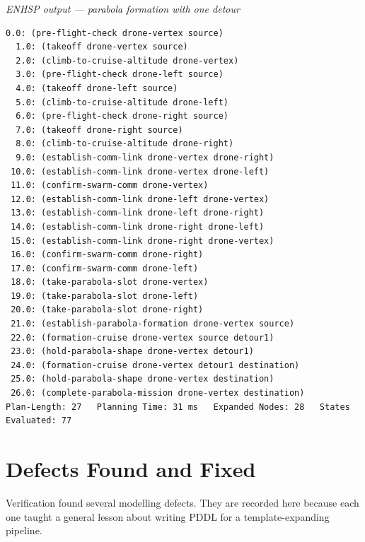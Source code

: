 \documentclass[11pt,a4paper,oneside]{report}
\newcommand{\recordlabel}[1]{\par\smallskip\noindent\hspace*{1.2em}\textit{#1}\par}
\begin{document}
\recordlabel{ENHSP output --- parabola formation with one detour}
\begin{lstlisting}[style=plain]
  0.0: (pre-flight-check drone-vertex source)
  1.0: (takeoff drone-vertex source)
  2.0: (climb-to-cruise-altitude drone-vertex)
  3.0: (pre-flight-check drone-left source)
  4.0: (takeoff drone-left source)
  5.0: (climb-to-cruise-altitude drone-left)
  6.0: (pre-flight-check drone-right source)
  7.0: (takeoff drone-right source)
  8.0: (climb-to-cruise-altitude drone-right)
  9.0: (establish-comm-link drone-vertex drone-right)
 10.0: (establish-comm-link drone-vertex drone-left)
 11.0: (confirm-swarm-comm drone-vertex)
 12.0: (establish-comm-link drone-left drone-vertex)
 13.0: (establish-comm-link drone-left drone-right)
 14.0: (establish-comm-link drone-right drone-left)
 15.0: (establish-comm-link drone-right drone-vertex)
 16.0: (confirm-swarm-comm drone-right)
 17.0: (confirm-swarm-comm drone-left)
 18.0: (take-parabola-slot drone-vertex)
 19.0: (take-parabola-slot drone-left)
 20.0: (take-parabola-slot drone-right)
 21.0: (establish-parabola-formation drone-vertex source)
 22.0: (formation-cruise drone-vertex source detour1)
 23.0: (hold-parabola-shape drone-vertex detour1)
 24.0: (formation-cruise drone-vertex detour1 destination)
 25.0: (hold-parabola-shape drone-vertex destination)
 26.0: (complete-parabola-mission drone-vertex destination)
Plan-Length: 27   Planning Time: 31 ms   Expanded Nodes: 28   States Evaluated: 77
\end{lstlisting}

\section{Defects Found and Fixed}\label{sec:defects}
Verification found several modelling defects. They are recorded here because each one taught a
general lesson about writing PDDL for a template-expanding pipeline.
\end{document}
